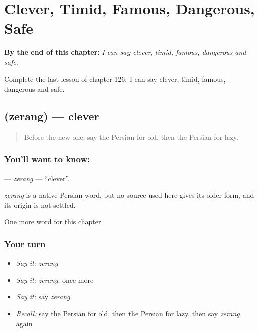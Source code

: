 
\chapter{Clever, Timid, Famous, Dangerous, Safe}
\label{ch:fa-clever-timid-famous-dangerous-safe}

\begin{chapteropening}
\textbf{By the end of this chapter:} \emph{I can say clever, timid, famous, dangerous and safe.}

Complete the last lesson of chapter 126: I can say clever, timid, famous, dangerous and safe.
\end{chapteropening}

\section[\texorpdfstring{\fa{زرنگ} (zerang)}{زرنگ (zerang)}]{ (zerang) — clever}

\label{lesson:FA-C126-zerang}



\begin{quote}
Before the new one: say the Persian for old, then the Persian for lazy.
\end{quote}

\subsection*{You'll want to know: }
\textbf{} — \emph{zerang} — \textquotedblleft{}clever\textquotedblright{}.

\begin{cousinweb}
\emph{zerang} is a native Persian word, but no source used here gives its older form, and its origin is not settled.
\end{cousinweb}

\begin{grammarlens}[title={What you've built}]
One more word for this chapter.
\end{grammarlens}

\subsection*{Your turn}
\begin{itemize}
\raggedright
  \item \emph{Say it:} \emph{zerang}
  \item \emph{Say it:} \emph{zerang}, once more
  \item \emph{Say it:} say \emph{zerang}
  \item \emph{Recall:} say the Persian for old, then the Persian for lazy, then say \emph{zerang} again
\end{itemize}

